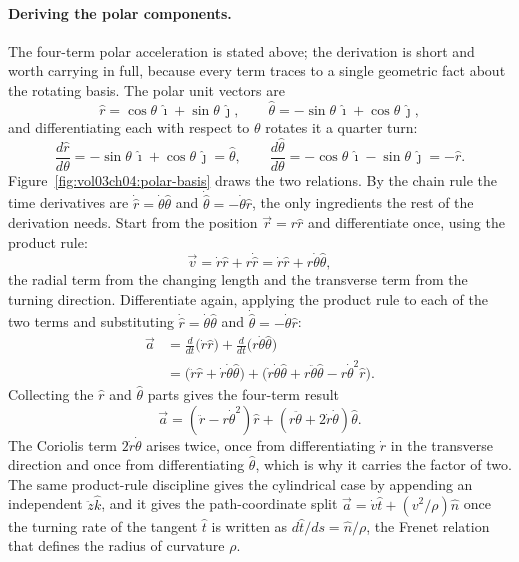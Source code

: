 \paragraph{Deriving the polar components.} The four-term polar
acceleration is stated above; the derivation is short and worth carrying
in full, because every term traces to a single geometric fact about the
rotating basis. The polar unit vectors are
\[
\hat{r}=\cos\theta\,\hat{\imath}+\sin\theta\,\hat{\jmath}, \qquad
\hat{\theta}=-\sin\theta\,\hat{\imath}+\cos\theta\,\hat{\jmath},
\]
and differentiating each with respect to $\theta$ rotates it a quarter
turn:
\[
\frac{d\hat{r}}{d\theta}=-\sin\theta\,\hat{\imath}+\cos\theta\,\hat{\jmath}
=\hat{\theta}, \qquad
\frac{d\hat{\theta}}{d\theta}=-\cos\theta\,\hat{\imath}-\sin\theta\,
\hat{\jmath}=-\hat{r}.
\]
Figure~\ref{fig:vol03ch04:polar-basis} draws the two relations. By the
chain rule the time derivatives are $\dot{\hat{r}}=\dot{\theta}
\hat{\theta}$ and $\dot{\hat{\theta}}=-\dot{\theta}\hat{r}$, the only
ingredients the rest of the derivation needs. Start from the position
$\vec{r}=r\hat{r}$ and differentiate once, using the product rule:
\[
\vec{v}=\dot{r}\hat{r}+r\dot{\hat{r}}=\dot{r}\hat{r}+r\dot{\theta}
\hat{\theta},
\]
the radial term from the changing length and the transverse term from
the turning direction. Differentiate again, applying the product rule to
each of the two terms and substituting $\dot{\hat{r}}=\dot{\theta}
\hat{\theta}$ and $\dot{\hat{\theta}}=-\dot{\theta}\hat{r}$:
\begin{align*}
\vec{a}&=\frac{d}{dt}\bigl(\dot{r}\hat{r}\bigr)
+\frac{d}{dt}\bigl(r\dot{\theta}\hat{\theta}\bigr)\\
&=\bigl(\ddot{r}\hat{r}+\dot{r}\dot{\theta}\hat{\theta}\bigr)
+\bigl(\dot{r}\dot{\theta}\hat{\theta}+r\ddot{\theta}\hat{\theta}
-r\dot{\theta}^{2}\hat{r}\bigr).
\end{align*}
Collecting the $\hat{r}$ and $\hat{\theta}$ parts gives the four-term
result
\[
\vec{a}=(\ddot{r}-r\dot{\theta}^{2})\hat{r}+(r\ddot{\theta}+2\dot{r}
\dot{\theta})\hat{\theta}.
\]
The Coriolis term $2\dot{r}\dot{\theta}$ arises twice, once from
differentiating $\dot{r}$ in the transverse direction and once from
differentiating $\hat{\theta}$, which is why it carries the factor of
two. The same product-rule discipline gives the cylindrical case by
appending an independent $\ddot{z}\hat{k}$, and it gives the
path-coordinate split $\vec{a}=\dot{v}\hat{t}+(v^{2}/\rho)\hat{n}$ once
the turning rate of the tangent $\hat{t}$ is written as
$d\hat{t}/ds=\hat{n}/\rho$, the Frenet relation that defines the radius
of curvature $\rho$.

